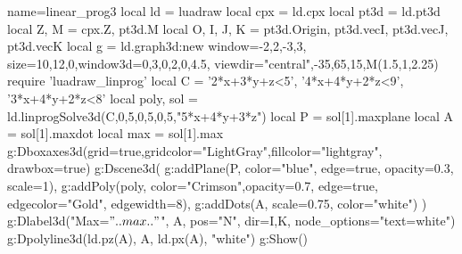 \begin{luadraw}{name=linear_prog3}
local ld = luadraw
local cpx = ld.cpx
local pt3d = ld.pt3d
local Z, M = cpx.Z, pt3d.M
local O, I, J, K = pt3d.Origin, pt3d.vecI, pt3d.vecJ, pt3d.vecK
local g = ld.graph3d:new{ window={-2,2,-3,3}, size={10,12,0},window3d={0,3,0,2,0,4.5}, 
    viewdir={"central",-35,65,15,M(1.5,1,2.25)}}
require 'luadraw_linprog'
local C = {'2*x+3*y+z<5', '4*x+4*y+2*z<9', '3*x+4*y+2*z<8'}
local poly, sol = ld.linprogSolve3d(C,0,5,0,5,0,5,{"5*x+4*y+3*z"})
local P = sol[1].maxplane
local A = sol[1].maxdot
local max = sol[1].max
g:Dboxaxes3d({grid=true,gridcolor="LightGray",fillcolor="lightgray", drawbox=true})
g:Dscene3d(
    g:addPlane(P, {color="blue", edge=true, opacity=0.3, scale=1}),
    g:addPoly(poly, {color="Crimson",opacity=0.7, edge=true, edgecolor="Gold", edgewidth=8}),
    g:addDots(A, {scale=0.75, color="white"})
    )
g:Dlabel3d("Max=$"..max.."$", A, {pos="N", dir={I,K}, node_options="text=white"})
g:Dpolyline3d({ld.pz(A), A, ld.px(A)}, "white")
g:Show()
\end{luadraw}

